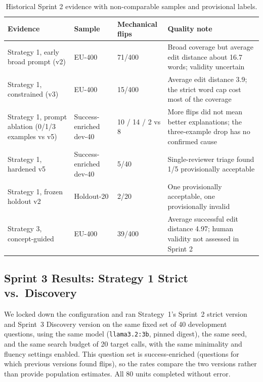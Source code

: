 \documentclass[11pt,a4paper]{article}
\begin{document}
\begin{table}[htbp]
\centering
\small
\begin{tabularx}{\textwidth}{@{}L{3.4cm}L{2.8cm}L{2.2cm}Y@{}}
\toprule
\textbf{Evidence} & \textbf{Sample} & \textbf{Mechanical flips} & \textbf{Quality note} \\
\midrule
Strategy 1, early broad prompt (v2) & EU-400 & 71/400 & Broad coverage but average edit distance about 16.7 words; validity uncertain \\
Strategy 1, constrained (v3) & EU-400 & 15/400 & Average edit distance 3.9; the strict word cap cost most of the coverage \\
Strategy 1, prompt ablation (0/1/3 examples vs v5) & Success-enriched dev-40 & 10 / 14 / 2 vs 8 & More flips did not mean better explanations; the three-example drop has no confirmed cause \\
Strategy 1, hardened v5 & Success-enriched dev-40 & 5/40 & Single-reviewer triage found 1/5 provisionally acceptable \\
Strategy 1, frozen holdout v2 & Holdout-20 & 2/20 & One provisionally acceptable, one provisionally invalid \\
Strategy 3, concept-guided & EU-400 & 39/400 & Average successful edit distance 4.97; human validity not assessed in Sprint 2 \\
\bottomrule
\end{tabularx}
\caption{Historical Sprint 2 evidence with non-comparable samples and provisional labels.}
\label{tab:prelim}
\end{table}

\subsection{Sprint 3 Results: Strategy 1 Strict vs.\ Discovery}
\label{sec:s1results}

We locked down the configuration and ran Strategy~1's Sprint~2 strict version and
Sprint~3 Discovery version on the same fixed set of 40 development questions, using
the same model (\texttt{llama3.2:3b}, pinned digest), the same seed, and the same
search budget of 20 target calls, with the same minimality and fluency settings
enabled. This question set is success-enriched (questions for which previous versions
found flips), so the rates compare the two versions rather than provide population
estimates. All 80 units completed without error.
\end{document}
